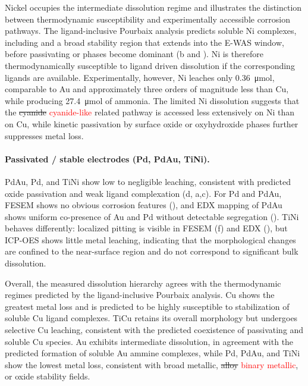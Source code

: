 \documentclass[twoside,twocolumn,9pt]{article}
\begin{document}
Nickel occupies the intermediate dissolution regime and illustrates the distinction between thermodynamic susceptibility and experimentally accessible corrosion pathways. The ligand-inclusive Pourbaix analysis predicts soluble Ni complexes, including  and a broad  stability region that extends into the E-WAS window, before passivating  or  phases become dominant (b and ). Ni is therefore thermodynamically susceptible to ligand driven dissolution if the corresponding ligands are available. Experimentally, however, Ni leaches only 0.36~\si{\micro mol}, comparable to Au and approximately three orders of magnitude less than Cu, while producing 27.4~\si{\micro mol} of ammonia. The limited Ni dissolution suggests that the \sout{cyanide} \textcolor{red}{cyanide-like} related pathway is accessed less extensively on Ni than on Cu, while kinetic passivation by surface oxide or oxyhydroxide phases further suppresses metal loss.


\paragraph{Passivated / stable electrodes (Pd, PdAu, TiNi).}
PdAu, Pd, and TiNi show low to negligible leaching, consistent with predicted oxide passivation and weak ligand complexation (d, a,c).  For Pd and PdAu, FESEM shows no obvious corrosion features (), and EDX mapping of PdAu shows uniform co-presence of Au and Pd without detectable segregation (). TiNi behaves differently: localized pitting is visible in FESEM (f) and EDX (), but ICP-OES shows little metal leaching, indicating that the morphological changes are confined to the near-surface region and do not correspond to significant bulk dissolution.

Overall, the measured dissolution hierarchy agrees with the thermodynamic regimes predicted by the ligand-inclusive Pourbaix analysis. Cu shows the greatest metal loss and is predicted to be highly susceptible to stabilization of soluble Cu ligand complexes. TiCu retains its overall morphology but undergoes selective Cu leaching, consistent with the predicted coexistence of passivating  and soluble Cu species. Au exhibits intermediate dissolution, in agreement with the predicted formation of soluble Au ammine complexes, while Pd, PdAu, and TiNi show the lowest metal loss, consistent with broad metallic, \sout{alloy} \textcolor{red}{binary metallic}, or oxide stability fields.
\end{document}
